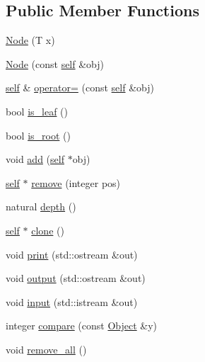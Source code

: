 \subsection*{Public Member Functions}
\begin{DoxyCompactItemize}
\item 
\hyperlink{classez_1_1objects_1_1Node_a7f6279fa0fafc1c205baeb0ce5f55ae0}{Node} (T x)
\item 
\hyperlink{classez_1_1objects_1_1Node_ab02e679bf8159e7743f96b86c4572fad}{Node} (const \hyperlink{classez_1_1objects_1_1Node}{self} \&obj)
\item 
\hyperlink{classez_1_1objects_1_1Node}{self} \& \hyperlink{classez_1_1objects_1_1Node_a057ec528cc64665369c2b25377d231dd}{operator=} (const \hyperlink{classez_1_1objects_1_1Node}{self} \&obj)
\item 
bool \hyperlink{classez_1_1objects_1_1Node_a5aff43ff4a0189a4a170e98c5c07e02e}{is\+\_\+leaf} ()
\item 
bool \hyperlink{classez_1_1objects_1_1Node_a954a589a87e9d63d8f070ac792a6d95f}{is\+\_\+root} ()
\item 
void \hyperlink{classez_1_1objects_1_1Node_ac47d8b9b552dea606aeeceb4d00fb2e2}{add} (\hyperlink{classez_1_1objects_1_1Node}{self} $\ast$obj)
\item 
\hyperlink{classez_1_1objects_1_1Node}{self} $\ast$ \hyperlink{classez_1_1objects_1_1Node_a6b86a03d9be4c515e624fe01f873ce8b}{remove} (integer pos)
\item 
natural \hyperlink{classez_1_1objects_1_1Node_a8c9182f152380cec769955b451a76347}{depth} ()
\item 
\hyperlink{classez_1_1objects_1_1Node}{self} $\ast$ \hyperlink{classez_1_1objects_1_1Node_ae2876fa89991bf6593f54e015f22a156}{clone} ()
\item 
void \hyperlink{classez_1_1objects_1_1Node_a56c80924a071a04d3fbb55c536efe293}{print} (std\+::ostream \&out)
\item 
void \hyperlink{classez_1_1objects_1_1Node_accf427aa06dc326baa7a12497cae6045}{output} (std\+::ostream \&out)
\item 
void \hyperlink{classez_1_1objects_1_1Node_a637eb76e0f2597e92c5f827b80bff0ca}{input} (std\+::istream \&out)
\item 
integer \hyperlink{classez_1_1objects_1_1Node_af5a55f4379b2f6be1ba3cf905d124462}{compare} (const \hyperlink{classez_1_1objects_1_1Object}{Object} \&y)
\item 
void \hyperlink{classez_1_1objects_1_1Node_aa6267eadf5df3a5e855d3cceec037653}{remove\+\_\+all} ()

\end{DoxyCompactItemize}
